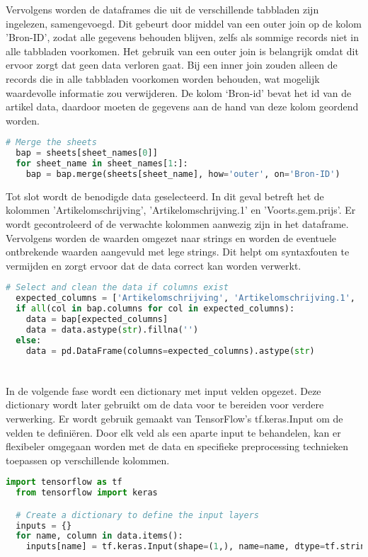 Vervolgens worden de dataframes die uit de verschillende tabbladen zijn ingelezen, samengevoegd. Dit gebeurt door middel van een outer join op de kolom 'Bron-ID', zodat alle gegevens behouden blijven, zelfs als sommige records niet in alle tabbladen voorkomen. Het gebruik van een outer join is belangrijk omdat dit ervoor zorgt dat geen data verloren gaat. Bij een inner join zouden alleen de records die in alle tabbladen voorkomen worden behouden, wat mogelijk waardevolle informatie zou verwijderen. De kolom ‘Bron-id’ bevat het id van de artikel data, daardoor moeten de gegevens aan de hand van deze kolom geordend worden.
\begin{lstlisting}[language=Python, caption={Het mergen van twee dataframes}]
  # Merge the sheets
  bap = sheets[sheet_names[0]]
  for sheet_name in sheet_names[1:]:
    bap = bap.merge(sheets[sheet_name], how='outer', on='Bron-ID')
\end{lstlisting}

Tot slot wordt de benodigde data geselecteerd. In dit geval betreft het de kolommen 'Artikelomschrijving', 'Artikelomschrijving.1' en 'Voorts.gem.prijs'. Er wordt gecontroleerd of de verwachte kolommen aanwezig zijn in het dataframe. Vervolgens worden de waarden omgezet naar strings en worden de eventuele ontbrekende waarden aangevuld met lege strings. Dit helpt om syntaxfouten te vermijden en zorgt ervoor dat de data correct kan worden verwerkt.
\begin{lstlisting}[language=Python, caption={Het selecteren en cleanen van de data}]
  # Select and clean the data if columns exist
  expected_columns = ['Artikelomschrijving', 'Artikelomschrijving.1', 'Voorts.gem.prijs']
  if all(col in bap.columns for col in expected_columns):
    data = bap[expected_columns]
    data = data.astype(str).fillna('')
  else:
    data = pd.DataFrame(columns=expected_columns).astype(str)
\end{lstlisting}

\section{}%
\label{sec:inputPreparatiePOC}

In de volgende fase wordt een dictionary met input velden opgezet. Deze dictionary wordt later gebruikt om de data voor te bereiden voor verdere verwerking. Er wordt gebruik gemaakt van TensorFlow's tf.keras.Input om de velden te definiëren. Door elk veld als een aparte input te behandelen, kan er flexibeler omgegaan worden met de data en specifieke preprocessing technieken toepassen op verschillende kolommen.
\begin{lstlisting}[language=Python, caption={Opzetten van een dictionary}]
  import tensorflow as tf
  from tensorflow import keras

  # Create a dictionary to define the input layers
  inputs = {}
  for name, column in data.items():
    inputs[name] = tf.keras.Input(shape=(1,), name=name, dtype=tf.string)
\end{lstlisting}

